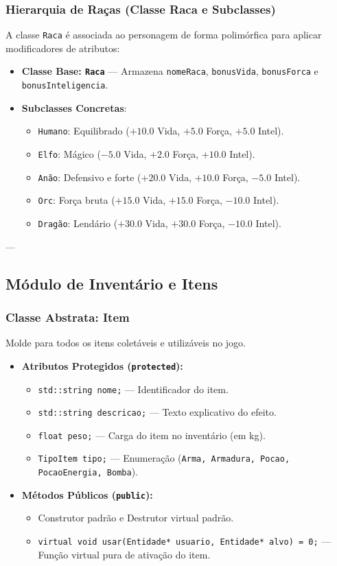 \documentclass[12pt,a4paper]{article}
\begin{document}
\subsubsection{Hierarquia de Raças (Classe Raca e Subclasses)}
A classe \texttt{Raca} é associada ao personagem de forma polimórfica para aplicar modificadores de atributos:
\begin{itemize}
    \item \textbf{Classe Base: \texttt{Raca}} --- Armazena \texttt{nomeRaca}, \texttt{bonusVida}, \texttt{bonusForca} e \texttt{bonusInteligencia}.
    \item \textbf{Subclasses Concretas}:
    \begin{itemize}
        \item \texttt{Humano}: Equilibrado ($+10.0$ Vida, $+5.0$ Força, $+5.0$ Intel).
        \item \texttt{Elfo}: Mágico ($-5.0$ Vida, $+2.0$ Força, $+10.0$ Intel).
        \item \texttt{Anão}: Defensivo e forte ($+20.0$ Vida, $+10.0$ Força, $-5.0$ Intel).
        \item \texttt{Orc}: Força bruta ($+15.0$ Vida, $+15.0$ Força, $-10.0$ Intel).
        \item \texttt{Dragão}: Lendário ($+30.0$ Vida, $+30.0$ Força, $-10.0$ Intel).
    \end{itemize}
\end{itemize}

---

\subsection{Módulo de Inventário e Itens}

\subsubsection{Classe Abstrata: Item}
Molde para todos os itens coletáveis e utilizáveis no jogo.
\begin{itemize}
    \item \textbf{Atributos Protegidos (\texttt{protected}):}
    \begin{itemize}
        \item \texttt{std::string nome;} --- Identificador do item.
        \item \texttt{std::string descricao;} --- Texto explicativo do efeito.
        \item \texttt{float peso;} --- Carga do item no inventário (em kg).
        \item \texttt{TipoItem tipo;} --- Enumeração (\texttt{Arma, Armadura, Pocao, PocaoEnergia, Bomba}).
    \end{itemize}
    \item \textbf{Métodos Públicos (\texttt{public}):}
    \begin{itemize}
        \item Construtor padrão e Destrutor virtual padrão.
        \item \texttt{virtual void usar(Entidade* usuario, Entidade* alvo) = 0;} --- Função virtual pura de ativação do item.
    \end{itemize}
\end{itemize}
\end{document}
